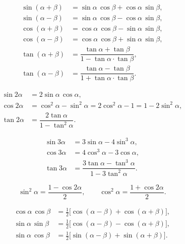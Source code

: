 \documentclass[12pt,a4paper]{article}
\begin{document}
\begin{congthuc}[title={Công thức cộng}]
  \begin{align*}
    \sin(\alpha + \beta) &= \sin\alpha\,\cos\beta + \cos\alpha\,\sin\beta, \\
    \sin(\alpha - \beta) &= \sin\alpha\,\cos\beta - \cos\alpha\,\sin\beta, \\
    \cos(\alpha + \beta) &= \cos\alpha\,\cos\beta - \sin\alpha\,\sin\beta, \\
    \cos(\alpha - \beta) &= \cos\alpha\,\cos\beta + \sin\alpha\,\sin\beta, \\[4pt]
    \tan(\alpha + \beta) &= \dfrac{\tan\alpha + \tan\beta}{1 - \tan\alpha\cdot\tan\beta}, \\[4pt]
    \tan(\alpha - \beta) &= \dfrac{\tan\alpha - \tan\beta}{1 + \tan\alpha\cdot\tan\beta}.
  \end{align*}
\end{congthuc}

\begin{congthuc}[title={Công thức nhân đôi}]
  \begin{align*}
    \sin 2\alpha &= 2\sin\alpha\,\cos\alpha, \\
    \cos 2\alpha &= \cos^2\alpha - \sin^2\alpha = 2\cos^2\alpha - 1 = 1 - 2\sin^2\alpha, \\[4pt]
    \tan 2\alpha &= \dfrac{2\tan\alpha}{1 - \tan^2\alpha}.
  \end{align*}
\end{congthuc}

\begin{congthuc}[title={Công thức nhân ba}]
  \begin{align*}
    \sin 3\alpha &= 3\sin\alpha - 4\sin^3\alpha, \\
    \cos 3\alpha &= 4\cos^3\alpha - 3\cos\alpha, \\[4pt]
    \tan 3\alpha &= \dfrac{3\tan\alpha - \tan^3\alpha}{1 - 3\tan^2\alpha}.
  \end{align*}
\end{congthuc}

\begin{congthuc}[title={Công thức hạ bậc}]
  \[
    \sin^2\alpha = \dfrac{1 - \cos 2\alpha}{2},\qquad
    \cos^2\alpha = \dfrac{1 + \cos 2\alpha}{2}.
  \]
\end{congthuc}

\begin{congthuc}[title={Biến đổi tích thành tổng}]
  \begin{align*}
    \cos\alpha\,\cos\beta &= \tfrac{1}{2}\bigl[\cos(\alpha - \beta) + \cos(\alpha + \beta)\bigr], \\
    \sin\alpha\,\sin\beta &= \tfrac{1}{2}\bigl[\cos(\alpha - \beta) - \cos(\alpha + \beta)\bigr], \\
    \sin\alpha\,\cos\beta &= \tfrac{1}{2}\bigl[\sin(\alpha - \beta) + \sin(\alpha + \beta)\bigr].
  \end{align*}
\end{congthuc}
\end{document}
